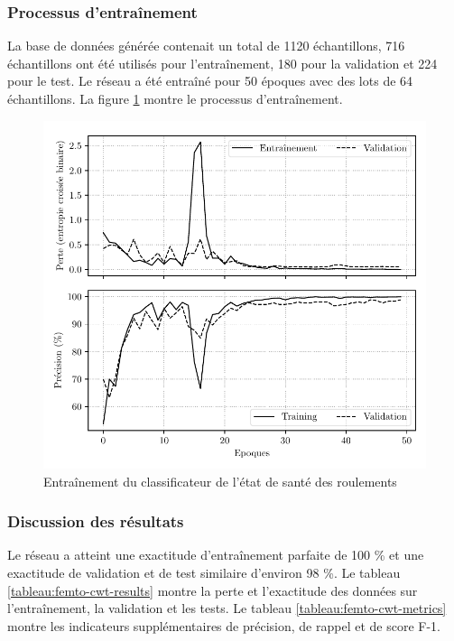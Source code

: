 \subsubsection{Processus d'entraînement}%
\label{subsub:training_process}
La base de données générée contenait un total de 1120 échantillons, 716 échantillons ont été utilisés pour l'entraînement, 180 pour la validation et 224 pour le test. Le réseau a été entraîné pour 50 époques avec des lots de 64 échantillons. La figure \ref{fig:scaleogram-classifier-training} montre le processus d'entraînement.

\begin{figure}[H]
	\centering
	\includegraphics{figures/femtocwt_training_fr.pdf}
	\caption{Entraînement du classificateur de l'état de santé des roulements}%
	\label{fig:scaleogram-classifier-training}
\end{figure}

\subsubsection{Discussion des résultats}%
\label{subsub:results-discussion}
Le réseau a atteint une exactitude d'entraînement parfaite de 100 \% et une exactitude de validation et de test similaire d'environ 98 \%. Le tableau \ref{tableau:femto-cwt-results} montre la perte et l'exactitude des données sur l'entraînement, la validation et les tests. Le tableau \ref{tableau:femto-cwt-metrics} montre les indicateurs supplémentaires de précision, de rappel et de score F-1.

